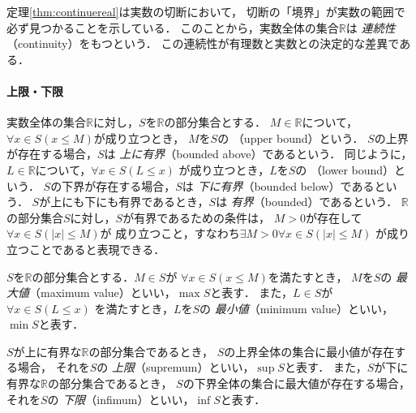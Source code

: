     定理\ref{thm:continuereal}は実数の切断において，
    切断の「境界」が実数の範囲で必ず見つかることを示している．
    このことから，実数全体の集合$\mathbb{R}$は
    \emph{連続性}（continuity）をもつという．
    この連続性が有理数と実数との決定的な差異である．

   \paragraph{上限・下限}
    実数全体の集合$\mathbb{R}$に対し，$S$を$\mathbb{R}$の部分集合とする．
    $M \in \mathbb{R}$について，$\forall x \in S( x \leq M)$が成り立つとき，
    $M$を$S$の
    \emph{}（upper bound）という．
    $S$の上界が存在する場合，$S$は
    \emph{上に有界}（bounded above）であるという．
    同じように，$L \in \mathbb{R}$について，$\forall x \in S (L \leq x)$
    が成り立つとき，$L$を$S$の
    \emph{}（lower bound）という．
    $S$の下界が存在する場合，$S$は
    \emph{下に有界}（bounded below）であるという．
    $S$が上にも下にも有界であるとき，$S$は
    \emph{有界}（bounded）であるという．
    $\mathbb{R}$の部分集合$S$に対し，$S$が有界であるための条件は，
    $M >0$が存在して$\forall x \in S( \lvert x \rvert \leq M)$が
    成り立つこと，すなわち$\exists M >0 \forall x \in S (\lvert x \rvert \leq M)$
    が成り立つことであると表現できる．

        $S$を$\mathbb{R}$の部分集合とする．$M \in S$が
    $\forall x \in S ( x \leq M)$を満たすとき，
    $M$を$S$の
    \emph{最大値}（maximum value）といい，$\max S$と表す．
    また，$L \in S$が$\forall x \in S ( L \leq x)$
    を満たすとき，$L$を$S$の
    \emph{最小値}（minimum value）といい，
    $\min S$と表す．
    
    $S$が上に有界な$\mathbb{R}$の部分集合であるとき，
    $S$の上界全体の集合に最小値が存在する場合，
    それを$S$の
    \emph{上限}（supremum）といい，$\sup S$と表す．
    また，$S$が下に有界な$\mathbb{R}$の部分集合であるとき，
    $S$の下界全体の集合に最大値が存在する場合，
    それを$S$の
    \emph{下限}（infimum）といい，$\inf S$と表す．

